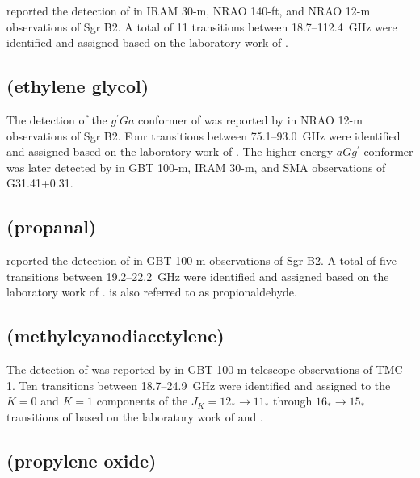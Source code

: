 \documentclass[twocolumn]{aastex631}
\begin{document}
	\citet{Combes:1987re} reported the detection of  in IRAM 30-m, NRAO 140-ft, and NRAO 12-m observations of Sgr B2.  A total of 11 transitions between 18.7--112.4~GHz were identified and assigned based on the laboratory work of \citet{Vacherand:1986kh}.
	
	\subsection{ (ethylene glycol)}
	\label{HOCH2CH2OH}
	
	The detection of the $g^{\prime}Ga$ conformer of  was reported by \citet{Hollis:2002ke} in NRAO 12-m observations of Sgr B2.  Four transitions between 75.1--93.0~GHz were identified and assigned based on the laboratory work of \citet{Christen:1995eu}.  The higher-energy $aGg^{\prime}$ conformer was later detected by \citet{Rivilla:2017ce} in GBT 100-m, IRAM 30-m, and SMA observations of G31.41+0.31.  
	
	\subsection{ (propanal)}
	\label{CH2CH2CHO}
	
	\citet{Hollis:2004oc} reported the detection of  in GBT 100-m observations of Sgr B2.  A total of five transitions between 19.2--22.2~GHz were identified and assigned based on the laboratory work of \citet{Butcher:1964jb}.   is also referred to as propionaldehyde.
	
	\subsection{ (methylcyanodiacetylene)}
	\label{CH3C5N}
	
	The detection of  was reported by \citet{Snyder:2006vi} in GBT 100-m telescope observations of TMC-1.  Ten transitions between 18.7--24.9~GHz were identified and assigned to the $K=0$ and $K=1$ components of the $J_K = 12_*\rightarrow11_*$ through $16_*\rightarrow15_*$ transitions of  based on the laboratory work of \citet{Alexander:1978bd} and \citet{Chen:1998hg}.
	
	\subsection{ (propylene oxide)}
	\label{CH3CHCH2O}
	
\end{document}
